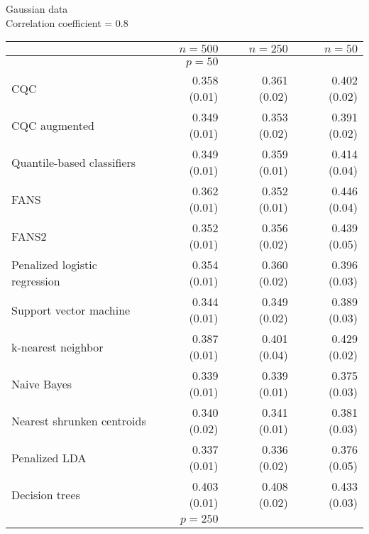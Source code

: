 \begin{table}[p]
  \centering
  Gaussian data \\
  Correlation coefficient = 0.8 \\[2ex]
  \begin{adjustbox}{max size={\textwidth}{10cm}}
    \begin{tabular}{l@{\extracolsep{15mm}}rrr}
      
      \hline
      & $n=500$ & $n=250$ & $n=50$ \\ 
      \hline
      & $p = 50$ \\
      \hline

      CQC & 0.358 (0.01) & 0.361 (0.02) & 0.402 (0.02) \\ 
      CQC augmented & 0.349 (0.01) & 0.353 (0.02) & 0.391 (0.02) \\ 
      Quantile-based classifiers & 0.349 (0.01) & 0.359 (0.01) & 0.414 (0.04) \\ 
      FANS  & 0.362 (0.01) & 0.352 (0.01) & 0.446 (0.04) \\
      FANS2 & 0.352 (0.01) & 0.356 (0.02) & 0.439 (0.05) \\
      Penalized logistic regression & 0.354 (0.01) & 0.360 (0.02) & 0.396 (0.03) \\ 
      Support vector machine & 0.344 (0.01) & 0.349 (0.02) & 0.389 (0.03) \\ 
      k-nearest neighbor & 0.387 (0.01) & 0.401 (0.04) & 0.429 (0.02) \\ 
      Naive Bayes & 0.339 (0.01) & 0.339 (0.01) & 0.375 (0.03) \\ 
      Nearest shrunken centroids & 0.340 (0.02) & 0.341 (0.01) & 0.381 (0.03) \\ 
      Penalized LDA & 0.337 (0.01) & 0.336 (0.02) & 0.376 (0.05) \\ 
      Decision trees & 0.403 (0.01) & 0.408 (0.02) & 0.433 (0.03) \\ [2ex]

      \hline
      & $p = 250$ \\
      \hline


\end{tabular}
\end{adjustbox}
\end{table}
